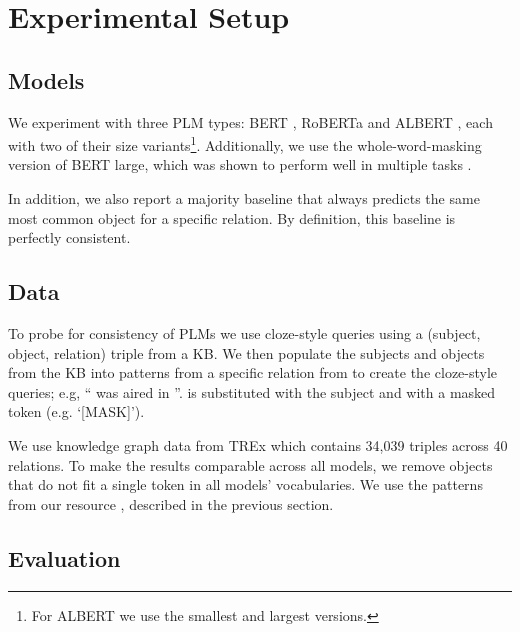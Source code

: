 \section{Experimental Setup}
\label{sec:setup}

\subsection{Models}
We experiment with three PLM types: BERT \cite{bert}, RoBERTa \cite{roberta} and ALBERT \cite{albert}, each with two of their  size variants\footnote{For ALBERT we use the smallest and largest versions.}. Additionally, we use the whole-word-masking version of BERT large, which was shown to perform well in multiple tasks \cite{talmor2019olmpics}.

In addition, we also report a majority baseline that always predicts the same most common object for a specific relation. By definition, this baseline is perfectly consistent.

\subsection{Data}


To probe for consistency of PLMs we use cloze-style queries using a (subject, object, relation) triple from a KB. We then populate the subjects and objects from the KB into patterns from a specific relation from \resource{} to create the cloze-style queries; e.g, ``\subj{} was aired in \obj{}''. \subj{} is substituted with the subject and \obj{} with a masked token (e.g. `[MASK]').

We use knowledge graph data from TREx \cite{trex} which contains 34,039 triples across 40 relations. To make the results comparable across all models, we remove objects that do not fit a single token in all models' vocabularies.
We use the patterns from our resource \resource{}, described in the previous section.



\subsection{Evaluation}
\label{sec:eval}



